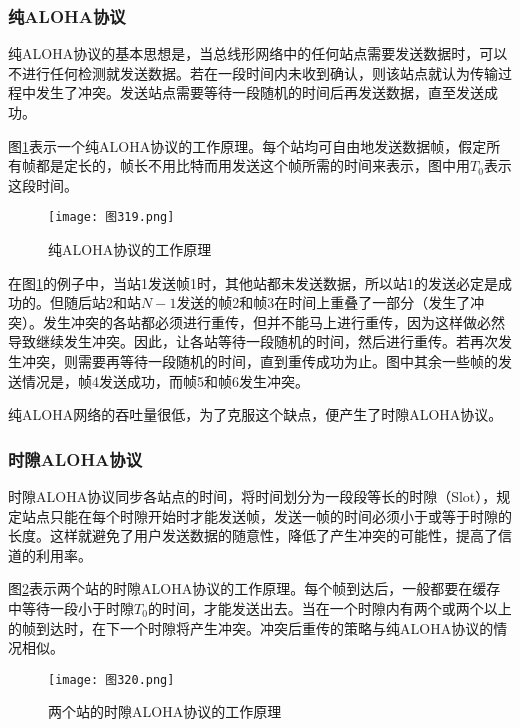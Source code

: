 \documentclass{ctexbook}
\begin{document}
	\subsubsection*{纯ALOHA协议}
	纯ALOHA协议的基本思想是，当总线形网络中的任何站点需要发送数据时，可以不进行任何检测就发送数据。若在一段时间内未收到确认，则该站点就认为传输过程中发生了冲突。发送站点需要等待一段随机的时间后再发送数据，直至发送成功。
	
	图\ref{fig:pure_aloha_principle}表示一个纯ALOHA协议的工作原理。每个站均可自由地发送数据帧，假定所有帧都是定长的，帧长不用比特而用发送这个帧所需的时间来表示，图中用$T_0$表示这段时间。
	
	\begin{figure}[h]
		\centering
		\caption{纯ALOHA协议的工作原理}
		\label{fig:pure_aloha_principle}
		\texttt{[image: 图319.png]} %
	\end{figure}
	
	在图\ref{fig:pure_aloha_principle}的例子中，当站1发送帧1时，其他站都未发送数据，所以站1的发送必定是成功的。但随后站2和站$N - 1$发送的帧2和帧3在时间上重叠了一部分（发生了冲突）。发生冲突的各站都必须进行重传，但并不能马上进行重传，因为这样做必然导致继续发生冲突。因此，让各站等待一段随机的时间，然后进行重传。若再次发生冲突，则需要再等待一段随机的时间，直到重传成功为止。图中其余一些帧的发送情况是，帧4发送成功，而帧5和帧6发生冲突。
	
	纯ALOHA网络的吞吐量很低，为了克服这个缺点，便产生了时隙ALOHA协议。
	
	\subsubsection*{时隙ALOHA协议}
	时隙ALOHA协议同步各站点的时间，将时间划分为一段段等长的时隙（Slot），规定站点只能在每个时隙开始时才能发送帧，发送一帧的时间必须小于或等于时隙的长度。这样就避免了用户发送数据的随意性，降低了产生冲突的可能性，提高了信道的利用率。
	
	图\ref{fig:slotted_aloha_principle}表示两个站的时隙ALOHA协议的工作原理。每个帧到达后，一般都要在缓存中等待一段小于时隙$T_0$的时间，才能发送出去。当在一个时隙内有两个或两个以上的帧到达时，在下一个时隙将产生冲突。冲突后重传的策略与纯ALOHA协议的情况相似。
	
	\begin{figure}[h]
		\centering
		\caption{两个站的时隙ALOHA协议的工作原理}
		\label{fig:slotted_aloha_principle}
		\texttt{[image: 图320.png]} %
	\end{figure}
	
\end{document}
